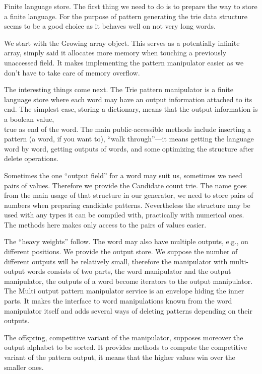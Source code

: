 Finite language store.
The first thing we need to do is to prepare the way to store a finite
language. For the purpose of pattern generating the trie data structure
seems to be a good choice as it behaves well on not very long words.

\fi

We start with the Growing array object. This serves as a potentially
infinite array, simply said it allocates more memory when touching a
previously unaccessed field. It makes implementing the pattern manipulator
easier as we don't have to take care of memory overflow.

\fi

The interesting things come next. The Trie pattern manipulator is a finite
language store where each word may have an output information attached to
its end. The simplest case, storing a dictionary, means that the output
information is a boolean value, \\{true} as end of the word. The main
public-accessible methods include inserting a pattern (a word, if you want
to), ``walk through''---it means getting the language word by word, getting
outputs of words, and some optimizing the structure after delete
operations.

Sometimes the one ``output field'' for a word may suit us, sometimes we
need pairs of values. Therefore we provide the Candidate count trie. The
name goes from the main usage of that structure in our generator, we need
to store pairs of numbers when preparing candidate patterns. Nevertheless
the structure may be used with any types it can be compiled with,
practically with numerical ones. The methods here makes only access to
the pairs of values easier.

\fi

The ``heavy weights'' follow. The word may also have multiple outputs,
e.g., on different positions. We provide the output store. We suppose the
number of different outputs will be relatively small, therefore the
manipulator with multi-output words consists of two parts, the word
manipulator and the output manipulator, the outputs of a word become
iterators to the output manipulator. The Multi output pattern manipulator
service is an envelope hiding the inner parts. It makes the interface to
word manipulations known from the word manipulator itself and adds several
ways of deleting patterns depending on their outputs.

The offspring, competitive variant of the manipulator, supposes moreover
the output alphabet to be sorted. It provides methods to compute the
competitive variant of the pattern output, it means that the higher values
win over the smaller ones.

